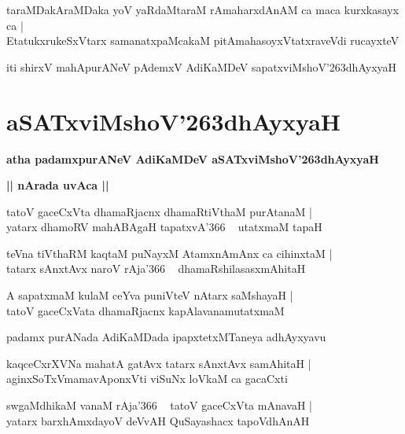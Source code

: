 \documentclass[twoside,12pt,openright]{book}
\def\S{\char'263}
\newcounter{shloka}[chapter]
\def\uvaca#1{\centerline{{\large\textbf{#1}}}}
\begin{document}
\begin{shloka}
taraMDakAraMDaka yoV yaRdaMtaraM rAmaharxdAnAM ca maca kurxkasayx ca |\\
EtatukxrukeSxVtarx samanatxpaMcakaM pitAmahasoyxVtatxraveVdi rucayxteV 
\end{shloka}

\begin{center}
iti shirxV mahApurANeV pAdemxV AdiKaMDeV sapatxviMshoV\S dhAyxyaH 
\end{center}

\chapter{aSATxviMshoV\S dhAyxyaH}

\begin{center}
{\LARGE\bfseries atha padamxpurANeV AdiKaMDeV aSATxviMshoV\S dhAyxyaH}
\end{center}

\uvaca{|| nArada uvAca ||}

\begin{shloka}
tatoV gaceCxVta dhamaRjacnx dhamaRtiVthaM purAtanaM |\\
yatarx dhamoRV mahABAgaH tapatxvA\char'366 ~ utatxmaM tapaH
\end{shloka}

\begin{shloka}
teVna tiVthaRM kaqtaM puNayxM AtamxnAmAnx ca cihinxtaM |\\
tatarx sAnxtAvx naroV rAja\char'366 ~ dhamaRshilasasxmAhitaH 
\end{shloka}

\begin{shloka}
A sapatxmaM kulaM ceYva puniVteV nAtarx saMshayaH |\\
tatoV gaceCxVata dhamaRjacnx kapAlavanamutatxmaM 
\end{shloka}

\begin{center}
padamx purANada AdiKaMDada ipapxtetxMTaneya adhAyxyavu 
\end{center}

\begin{shloka}
kaqceCxrXVNa mahatA gatAvx tatarx sAnxtAvx samAhitaH |\\
aginxSoTxVmamavAponxVti viSuNx loVkaM ca gacaCxti 
\end{shloka}

\begin{shloka}
swgaMdhikaM vanaM rAja\char'366 ~ tatoV gaceCxVta mAnavaH |\\
yatarx barxhAmxdayoV deVvAH QuSayashacx tapoVdhAnAH 
\end{shloka}
\end{document}
